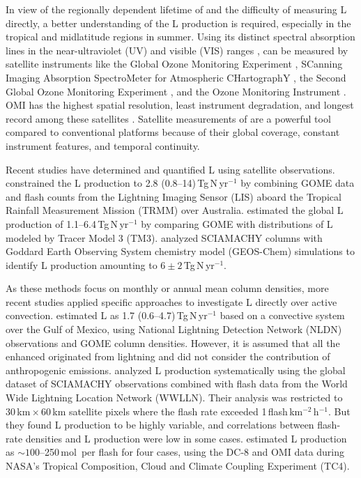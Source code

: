 \documentclass[amt]{copernicus}
\begin{document}
In view of the regionally dependent lifetime of  and the difficulty of measuring L directly, a better understanding of the L production is required, especially in the tropical and midlatitude regions in summer.
Using its distinct spectral absorption lines in the near-ultraviolet (UV) and visible (VIS) ranges \citep{Platt.1983},  can be measured by satellite instruments like the Global Ozone Monitoring Experiment \citep[GOME;][]{Burrows.1999, Richter.2005}, SCanning Imaging Absorption SpectroMeter for Atmospheric CHartographY \citep[SCIAMACHY;][]{Bovensmann.1999}, the Second Global Ozone Monitoring Experiment \citep[GOME-2;][]{Callies.2000}, and the Ozone Monitoring Instrument \citep[OMI;][]{Levelt.2006}.
OMI has the highest spatial resolution, least instrument degradation, and longest record among these satellites \citep{Krotkov.2017}.
Satellite measurements of  are a powerful tool compared to conventional platforms because of their global coverage, constant instrument features, and temporal continuity.

Recent studies have determined and quantified L using satellite observations.
\citet{Beirle.2004} constrained the L production to 2.8 (0.8--14)\,Tg\,N\,yr$^{-1}$ by combining GOME  data and flash counts from the Lightning Imaging Sensor (LIS) aboard the Tropical Rainfall Measurement Mission (TRMM) over Australia.
\citet{Boersma.2005} estimated the global L production of 1.1--6.4\,Tg\,N\,yr$^{-1}$ by comparing GOME  with distributions of L modeled by Tracer Model 3 (TM3).
\citet{Martin.2007} analyzed SCIAMACHY  columns with Goddard Earth Observing System chemistry model (GEOS-Chem) simulations to identify L production amounting to $6\pm 2$\,Tg\,N\,yr$^{-1}$.

As these methods focus on monthly or annual mean  column densities, more recent studies applied specific approaches to investigate L directly over active convection.
\citet{Beirle.2006} estimated L as 1.7 (0.6--4.7)\,Tg\,N\,yr$^{-1}$ based on a convective system over the Gulf of Mexico, using National Lightning Detection Network (NLDN) observations and GOME  column densities.
However, it is assumed that all the enhanced  originated from lightning and did not consider the contribution of anthropogenic emissions.
\citet{Beirle.2010} analyzed L production systematically using the global dataset of SCIAMACHY  observations combined with flash data from the World Wide Lightning Location Network (WWLLN).
Their analysis was restricted to 30\,km\,$\times$\,60\,km satellite pixels where the flash rate exceeded 1\,flash\,km$^{-2}$\,h$^{-1}$.
But they found L production to be highly variable, and correlations between flash-rate densities and L production were low in some cases.
\citet{Bucsela.2010} estimated L production as $\sim 100$--250\,mol\, per flash for four cases, using the DC-8 and OMI data during NASA's Tropical Composition, Cloud and Climate Coupling Experiment (TC4).
\end{document}
